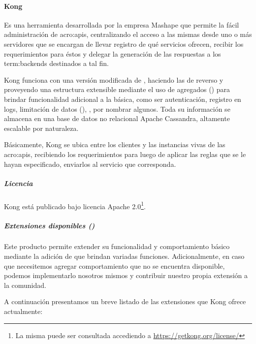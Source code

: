 \paragraph{Kong}
\label{soa:tecnologias:kong}

Es una herramienta desarrollada por la empresa Mashape que permite la fácil administración de \glspl{acro:api}, centralizando el acceso a las mismas desde uno o más servidores que se encargan de llevar registro de qué servicios ofrecen, recibir los requerimientos para éstos y delegar la generación de las respuestas a los \glspl{term:backend} destinados a tal fin.

Kong funciona con una versión modificada de , haciendo las de  reverso y proveyendo una estructura extensible mediante el uso de agregados () para brindar funcionalidad adicional a la básica, como ser autenticación, registro en logs, limitación de datos (), , por nombrar algunos. Toda su información se almacena en una base de datos no relacional Apache Cassandra, altamente escalable por naturaleza.

Básicamente, Kong se ubica entre los clientes y las instancias vivas de las \glspl{acro:api}, recibiendo los requerimientos para luego de aplicar las reglas que se le hayan especificado, enviarlos al servicio que corresponda.

\subparagraph{Licencia}

Kong está publicado bajo licencia Apache 2.0\footnote{La misma puede ser consultada accediendo a \url{https://getkong.org/license/}}.

\subparagraph{Extensiones disponibles ()}

Este producto permite extender su funcionalidad y comportamiento básico mediante la adición de  que brindan variadas funciones. Adicionalmente, en caso que necesitemos agregar comportamiento que no se encuentra disponible, podemos implementarlo nosotros mismos y contribuir nuestro propia extensión a la comunidad.

A continuación presentamos un breve listado de las extensiones que Kong ofrece actualmente:

